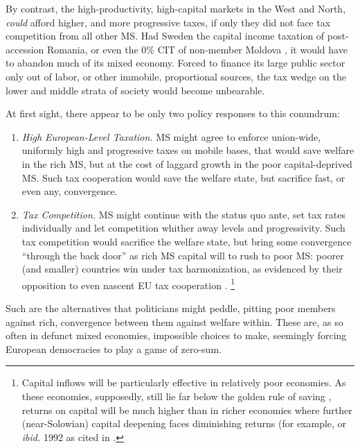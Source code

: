 By contrast, the high-productivity, high-capital markets in the West and North, \emph{could} afford higher, and more progressive taxes, if only they did not face tax competition from all other \gls{MS}.
Had Sweden the capital income taxation of post-accession Romania, or even the 0\% \gls{CIT} of non-member Moldova \citep{Piatkowski2008}, it would have to abandon much of its mixed economy.
Forced to finance its large public sector only out of labor, or other immobile, proportional sources, the tax wedge on the lower and middle strata of society would become unbearable.

At first sight, there appear to be only two policy responses to this conundrum:
\begin{enumerate}
	\item \emph{High European-Level Taxation.} \gls{MS} might agree to enforce union-wide, uniformly high and progressive taxes on mobile bases, that would save welfare in the rich \gls{MS}, but at the cost of laggard growth in the poor capital-deprived \gls{MS}.
Such tax cooperation would save the welfare state, but sacrifice fast, or even any, convergence.
	\item \emph{Tax Competition.} \gls{MS} might continue with the status quo ante, set tax rates individually and let competition whither away levels and progressivity.
Such tax competition would sacrifice the welfare state, but bring some convergence ``through the back door'' as rich \gls{MS} capital will to rush to poor \gls{MS}:
poorer (and smaller) countries win under tax harmonization, as evidenced by their opposition to even nascent \gls{EU} tax cooperation \citep[138]{Kellermann2009}.
\footnote{
	Capital inflows will be particularly effective in relatively poor economies.
	As these economies, supposedly, still lie far below the golden rule of saving \citep{Solow1956}, returns on capital will be much higher than in richer economies where further (near-Solowian) capital deepening faces diminishing returns (for example, \citealt{Barro1995} or \emph{ibid.} 1992 as cited in \cite[3]{Beckfield2009}.
}
\end{enumerate}

Such are the alternatives that politicians might peddle, pitting poor members against rich, convergence between them against welfare within.
These are, as so often in defunct mixed economies, impossible choices to make, seemingly forcing European democracies to play a game of zero-sum.

